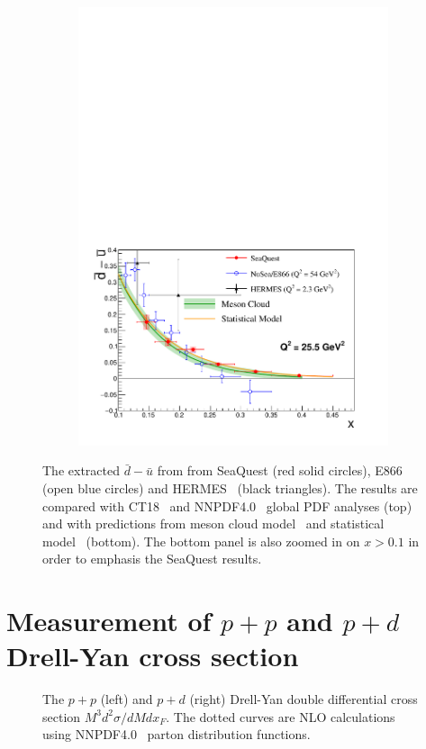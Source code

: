\documentclass[reprint,aps,unsortedaddress,superscriptaddress,prc,floatfix,showpacs,linenumbers]{revtex4-2}
\begin{document}
\begin{figure}[htpb!]
\begin{subfigure}{\linewidth}
		\includegraphics[width=\linewidth]{dbub_diff_with_model.pdf}
	\end{subfigure}
	\caption{The extracted $\bar{d}-\bar{u}$ from from SeaQuest (red solid circles), E866~\cite{towell2001} (open blue circles)
		and HERMES~\cite{ackerstaff1998} (black triangles).
		The results are compared with CT18~\cite{hou2021} and NNPDF4.0~\cite{ball2022a} global PDF analyses (top)
		and with predictions from meson cloud model~\cite{alberg2022} and statistical model~\cite{soffer2019} (bottom).
		The bottom panel is also zoomed in on $x>0.1$ in order to emphasis the SeaQuest results.}
	\label{fig:e906_e866_dbarMubar}
\end{figure}

\section{Measurement of \texorpdfstring{$p+p$}{p+p} and \texorpdfstring{$p+d$}{p+d} Drell-Yan cross section}
\label{sec:abs_cs}
\begin{figure}
	\caption{The $p+p$ (left) and $p+d$ (right) Drell-Yan double differential cross section $M^3d^2\sigma/dMdx_F$.
		The dotted curves are NLO calculations using NNPDF4.0~\cite{ball2022a} parton distribution functions.}
\end{figure}
\end{document}
